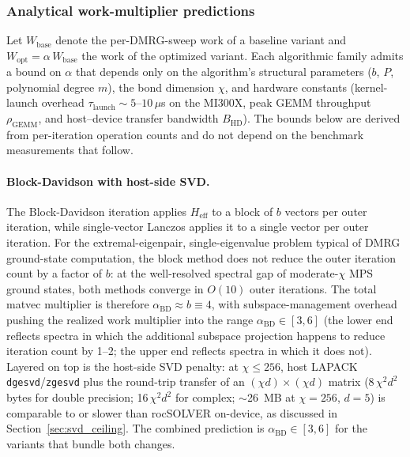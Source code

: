 \documentclass[preprint,12pt]{elsarticle}
\begin{document}
\subsubsection{Analytical work-multiplier predictions}
\label{sec:opt_analytical}

Let $W_\text{base}$ denote the per-DMRG-sweep work of a baseline variant and $W_\text{opt} = \alpha\, W_\text{base}$ the work of the optimized variant. Each algorithmic family admits a bound on $\alpha$ that depends only on the algorithm's structural parameters ($b$, $P$, polynomial degree $m$), the bond dimension $\chi$, and hardware constants (kernel-launch overhead $\tau_\text{launch} \sim 5$--$10\,\mu$s on the MI300X, peak GEMM throughput $\rho_\text{GEMM}$, and host--device transfer bandwidth $B_\text{HD}$). The bounds below are derived from per-iteration operation counts and do not depend on the benchmark measurements that follow.

\paragraph{Block-Davidson with host-side SVD.}
The Block-Davidson iteration applies $H_\text{eff}$ to a block of $b$ vectors per outer iteration, while single-vector Lanczos applies it to a single vector per outer iteration.
For the extremal-eigenpair, single-eigenvalue problem typical of DMRG ground-state computation, the block method does not reduce the outer iteration count by a factor of $b$: at the well-resolved spectral gap of moderate-$\chi$ MPS ground states, both methods converge in $O(10)$ outer iterations.
The total matvec multiplier is therefore $\alpha_\text{BD} \approx b \equiv 4$, with subspace-management overhead pushing the realized work multiplier into the range $\alpha_\text{BD} \in [3, 6]$ (the lower end reflects spectra in which the additional subspace projection happens to reduce iteration count by 1--2; the upper end reflects spectra in which it does not).
Layered on top is the host-side SVD penalty: at $\chi \le 256$, host LAPACK \texttt{dgesvd}/\texttt{zgesvd} plus the round-trip transfer of an $(\chi d)\times(\chi d)$ matrix (8\,$\chi^2 d^2$ bytes for double precision; 16\,$\chi^2 d^2$ for complex; $\sim$26~MB at $\chi=256$, $d=5$) is comparable to or slower than rocSOLVER on-device, as discussed in Section~\ref{sec:svd_ceiling}.
The combined prediction is $\alpha_\text{BD} \in [3, 6]$ for the variants that bundle both changes.
\end{document}
